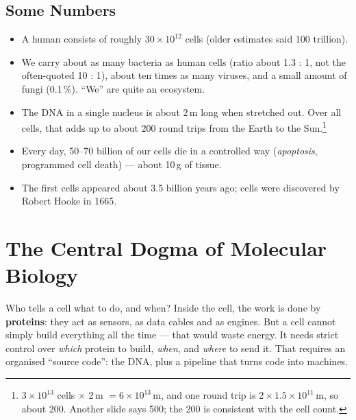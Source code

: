 \documentclass[11pt, oneside]{book}
\let\originalsection\section
\renewcommand{\section}{\Needspace{7\baselineskip}\originalsection}
\let\originalsubsection\subsection
\renewcommand{\subsection}{\Needspace{6\baselineskip}\originalsubsection}
\begin{document}
\subsection{Some Numbers}

\begin{itemize}
  \item A human consists of roughly $30 \times 10^{12}$ cells (older estimates
    said 100 trillion).
  \item We carry about as many bacteria as human cells (ratio about 1.3 : 1,
    not the often-quoted 10 : 1), about ten times as many viruses, and a small
    amount of fungi (0.1\,\%). ``We'' are quite an ecosystem.
  \item The DNA in a single nucleus is about 2\,m long when stretched out.
    Over all cells, that adds up to about 200 round trips from the Earth to
    the Sun.\footnote{$3 \times 10^{13}$ cells $\times$ 2\,m $= 6 \times
    10^{13}$\,m, and one round trip is $2 \times 1.5 \times 10^{11}$\,m, so
    about 200. Another slide says 500; the 200 is consistent with the cell
    count.}
  \item Every day, 50--70 billion of our cells die in a controlled way
    (\emph{apoptosis}, programmed cell death) --- about 10\,g of tissue.
  \item The first cells appeared about 3.5 billion years ago; cells were
    discovered by Robert Hooke in 1665.
\end{itemize}

\section{The Central Dogma of Molecular Biology}
\label{sec:central-dogma}

Who tells a cell what to do, and when? Inside the cell, the work is done by
\textbf{proteins}: they act as sensors, as data cables and as engines. But a
cell cannot simply build everything all the time --- that would waste
energy. It needs strict control over \emph{which} protein to build,
\emph{when}, and \emph{where} to send it. That requires an organised
``source code'': the DNA, plus a pipeline that turns code into machines.
\end{document}
